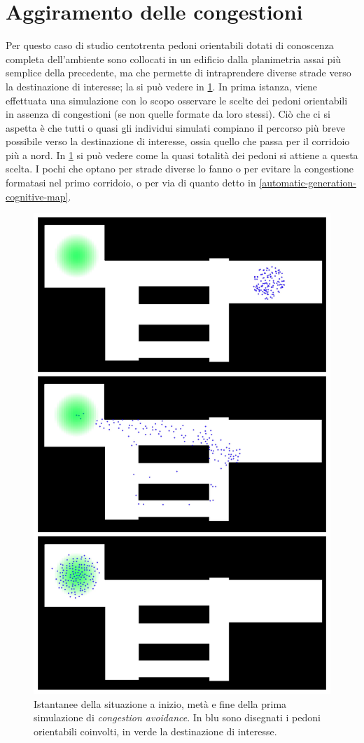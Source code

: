 \documentclass[12pt,a4paper,openright,oneside]{book}
\begin{document}
\section{Aggiramento delle congestioni}
\label{congestion-avoidance-case-study}
Per questo caso di studio centotrenta pedoni orientabili dotati di conoscenza completa dell'ambiente sono collocati in un edificio dalla planimetria assai più semplice della precedente, ma che permette di intraprendere diverse strade verso la destinazione di interesse; la si può vedere in \cref{fig:congestion-avoidance-1}. In prima istanza, viene effettuata una simulazione con lo scopo osservare le scelte dei pedoni orientabili in assenza di congestioni (se non quelle formate da loro stessi). Ciò che ci si aspetta è che tutti o quasi gli individui simulati compiano il percorso più breve possibile verso la destinazione di interesse, ossia quello che passa per il corridoio più a nord. In \cref{fig:congestion-avoidance-1} si può vedere come la quasi totalità dei pedoni si attiene a questa scelta. I pochi che optano per strade diverse lo fanno o per evitare la congestione formatasi nel primo corridoio, o per via di quanto detto in \ref{automatic-generation-cognitive-map}. 
\begin{figure}
	\centering
	\includegraphics[width=0.7\linewidth]{figures/congestion-avoidance-1.png}
	\caption{Istantanee della situazione a inizio, metà e fine della prima simulazione di \emph{congestion avoidance}. In blu sono disegnati i pedoni orientabili coinvolti, in verde la destinazione di interesse.}
	\label{fig:congestion-avoidance-1}
\end{figure}
\end{document}
